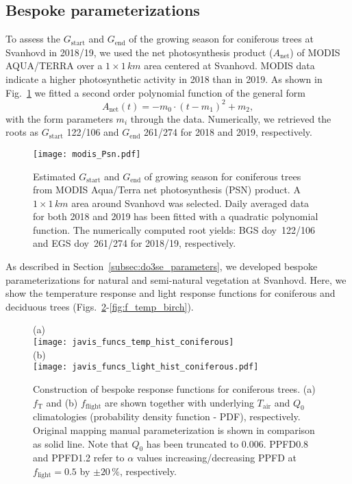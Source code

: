 \documentclass[bg, manuscript]{copernicus}
\begin{document}
\subsection{Bespoke parameterizations}

To assess the $G_\mathrm{start}$  and $G_\mathrm{end}$ of the growing season for coniferous trees at Svanhovd in 2018/19, we used the net photosynthesis product ($A_\mathrm{net}$) of MODIS AQUA/TERRA over a $1\times 1\,\unit{km}$ area centered at Svanhovd. MODIS data indicate a higher photosynthetic activity in 2018 than in 2019. As shown in Fig.~\ref{fig:modis_Psn} we fitted a second order polynomial function of the general form
%
\begin{equation}
A_\mathrm{net}(t) =  -m_0\cdot(t-m_1)^2+m_2,
\end{equation}
%
with the form parameters $m_i$ through the data. Numerically, we retrieved the roots as $G_\mathrm{start}$ 122/106 and $G_\mathrm{end}$ 261/274 for 2018 and 2019, respectively. 

\begin{figure}[th]
  \texttt{[image: modis\_Psn.pdf]}
  \caption{Estimated $G_\mathrm{start}$ and $G_\mathrm{end}$ of growing season for coniferous trees from MODIS Aqua/Terra net photosynthesis (PSN) product. A $1\times 1\,\unit{km}$ area around Svanhovd was selected. Daily averaged data for both 2018 and 2019 has been fitted with a quadratic polynomial function. The numerically computed root yields: BGS \unit{doy}~122/106 and EGS \unit{doy}~261/274 for 2018/19, respectively.}
  \label{fig:modis_Psn}
\end{figure}

As described in Section~\ref{subsec:do3se_parameters}, we developed bespoke parameterizations for natural and semi-natural vegetation at Svanhovd. Here, we show the temperature response and light response functions for coniferous and deciduous trees (Figs.~\ref{fig:f_temp_spruce}-\ref{fig:f_temp_birch}). 

\begin{figure}[t]
  \centering
  (a)\\
  \texttt{[image: javis\_funcs\_temp\_hist\_coniferous]}\\
  (b)\\
  \texttt{[image: javis\_funcs\_light\_hist\_coniferous.pdf]}
\caption{Construction of bespoke response functions for coniferous trees. (a) $f_\mathrm{T}$ and (b) $f_\mathrm{flight}$ are shown together with underlying $T_\mathrm{air}$ and $Q_0$ climatologies (probability density function - PDF), respectively. Original mapping manual parameterization is shown in comparison as solid line. Note that $Q_0$ has been truncated to $0.006$. PPFD0.8 and PPFD1.2 refer to $\alpha$ values increasing/decreasing PPFD at $f_\mathrm{light}=0.5$ by $\pm 20\,\%$, respectively.}
\label{fig:f_temp_spruce}
\end{figure}
\end{document}
